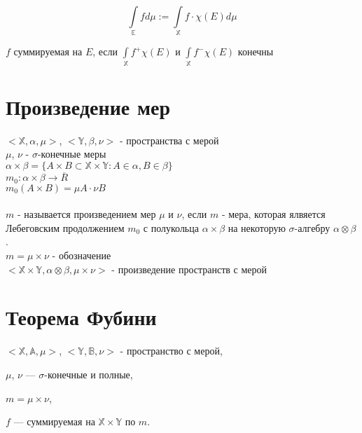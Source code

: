 \documentclass[paper=a4, fontsize=17pt]{article}
\begin{document}
	$$\int\limits_{\mathds{E}}f d\mu := \int\limits_{\mathds{X}}f \cdot \chi(E) d\mu$$
	
	$f$ суммируемая на $E$, если $\int\limits_{\mathds{X}}f^+ \chi(E)$ и $\int\limits_{\mathds{X}}f^- \chi(E)$ конечны
	
	\section{Произведение мер}
	$<\mathds{X}, \alpha, \mu>$, $<\mathds{Y}, \beta, \nu>$ - пространства с мерой\\
	$\mu$, $\nu$ - $\sigma$-конечные меры\\
	$\alpha \times \beta = \{A\times B \subset \mathds{X} \times \mathds{Y} : A \in \alpha, B \in \beta \}$ \\
	$m_0 : \alpha \times \beta \rightarrow \overline R$\\ $m_0(A \times B) = \mu A \cdot \nu B$ \\\\
	$m$ - называется произведением мер $\mu$ и $\nu$, если $m$ - мера, которая ялвяется Лебеговским продолжением $m_0$ с полукольца $\alpha \times \beta$ на некоторую $\sigma$-алгебру $\alpha \otimes \beta$.\\
	$m = \mu \times \nu$ - обозначение \\
	$<\mathds{X} \times \mathds{Y}, \alpha \otimes \beta, \mu \times \nu>$ - произведение пространств с мерой
	
	\section{Теорема Фубини}
	$<\mathds{X}, \mathds{A}, \mu>$, $<\mathds{Y}, \mathds{B}, \nu>$ - пространство с мерой,
	
	$\mu$, $\nu$ --- $\sigma$-конечные и полные,
	
	$m = \mu \times \nu$,
	
	$f$ --- суммируемая на $\mathds{X} \times \mathds{Y}$ по $m$.
	
\end{document}
